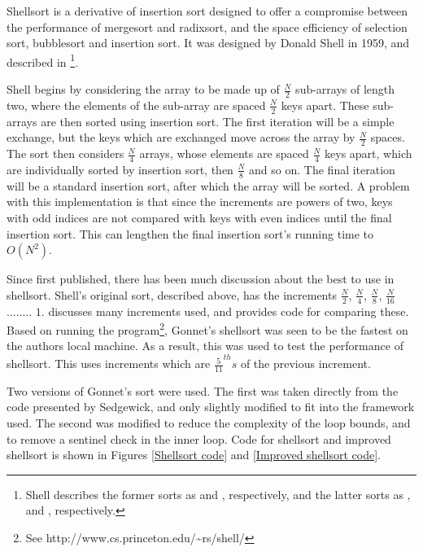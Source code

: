 \label{shell}

Shellsort is a derivative of insertion sort designed to offer a compromise
between the performance of mergesort and radixsort, and the space efficiency of
selection sort, bubblesort and insertion sort. It was designed by Donald Shell
in 1959, and described in \cite{Shell59}\footnote{Shell describes the former
sorts as  and , respectively, and the
latter sorts as ,  and
, respectively.}.

Shell begins by considering the array to be made up of $\frac{N}{2}$ sub-arrays
of length two, where the elements of the sub-array are spaced $\frac{N}{2}$ keys
apart.  These sub-arrays are then sorted using insertion sort. The first
iteration will be a simple exchange, but the keys which are exchanged move
across the array by $\frac{N}{2}$ spaces. The sort then considers $\frac{N}{4}$
arrays, whose elements are spaced $\frac{N}{4}$ keys apart, which are
individually sorted by insertion sort, then $\frac{N}{8}$ and so on. The final
iteration will be a standard insertion sort, after which the array will be
sorted. A problem with this implementation is that since the increments are
powers of two, keys with odd indices are not compared with keys with even
indices until the final insertion sort. This can lengthen the final insertion
sort's running time to $O(N^2)$.

Since first published, there has been much discussion about the best
 to use in shellsort. Shell's original sort, described above,
has the increments $\frac{N}{2}$, $\frac{N}{4}$, $\frac{N}{8}$, $\frac{N}{16}$
........ $1$. \cite{Sedgewick96} discusses many increments used, and provides
code for comparing these. Based on running the  program\footnote{See
http://www.cs.princeton.edu/\textasciitilde{}rs/shell/}, Gonnet's shellsort was
seen to be the fastest on the authors local machine. As a result, this was used
to test the performance of shellsort. This uses increments which are
$\frac{5}{11}^{th}s$ of the previous increment.

Two versions of Gonnet's sort were used. The first was taken directly from the
code presented by Sedgewick, and only slightly modified to fit into the
framework used.  The second was modified to reduce the complexity of the loop
bounds, and to remove a sentinel check in the inner loop. Code for shellsort and
improved shellsort is shown in Figures \ref{Shellsort code} and \ref{Improved
shellsort code}.

